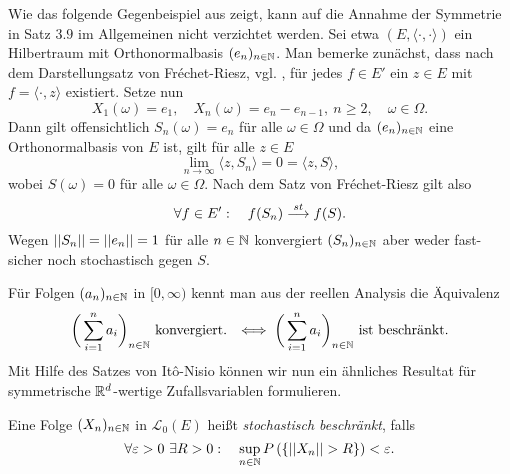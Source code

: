 \begin{remark}
    Wie das folgende Gegenbeispiel aus \cite{ito-nisio} zeigt, kann auf die Annahme der Symmetrie in Satz $3.9$ im Allgemeinen nicht verzichtet werden. Sei etwa $(E, \langle\cdot,\cdot\rangle)$ ein Hilbertraum mit Orthonormalbasis $(e_n)_{n \in \mathbb{N}}$.
    Man bemerke zunächst, dass nach dem Darstellungsatz von Fréchet-Riesz, vgl. \cite[Theorem V.3.6]{werner}, für jedes $f \in E'$ ein $z \in E$ mit $f = \langle \cdot, z \rangle$ existiert. 
    Setze nun 
    $$
        X_1(\omega) = e_1, \quad X_n(\omega) = e_n - e_{n-1}, \ n \geq 2, \quad \omega \in \Omega. 
    $$
    Dann gilt offensichtlich $S_n(\omega) = e_n$ für alle $\omega \in \Omega$ und da $(e_n)_{n \in \mathbb{N}}$ eine Orthonormalbasis von $E$ ist, gilt für alle $z \in E$
    $$
        \lim_{n \to \infty}\langle z,S_n \rangle = 0 = \langle z,S \rangle,
    $$
    wobei $S(\omega) = 0$ für alle $\omega \in \Omega$. Nach dem Satz von Fréchet-Riesz gilt also 
    $$
        \forall f \in E': \quad f(S_n) \overset{st}{\longrightarrow} f(S). 
    $$
    Wegen $\lvert\lvert S_n \rvert\rvert = \lvert\lvert e_n \rvert\rvert =1$ für alle $n \in \mathbb{N}$ konvergiert $(S_n)_{n \in \mathbb{N}}$ aber weder fast-sicher noch stochastisch gegen $S$. 
    \qexampled 
\end{remark}

Für Folgen $(a_n)_{n \in \mathbb{N}}$ in $[0, \infty)$ kennt man aus der reellen Analysis die Äquivalenz
$$
    \bigg(\sum_{i=1}^n a_i\bigg)_{n \in \mathbb{N}} \text{ konvergiert. } \iff \bigg(\sum_{i=1}^n a_i\bigg)_{n \in \mathbb{N}} \text{ ist beschränkt.}
$$
Mit Hilfe des Satzes von Itô-Nisio können wir nun ein ähnliches Resultat für symmetrische $\mathbb{R}^d$-wertige Zufallsvariablen formulieren. 

\begin{mydef}
    Eine Folge $(X_n)_{n \in \mathbb{N}}$ in $\mathcal{L}_0(E)$ heißt \textit{stochastisch beschränkt}, falls
    $$
        \forall \varepsilon >0 \ \exists R > 0: \quad \sup_{n \in \mathbb{N}}P\left(\left\{ \lvert\lvert X_n \rvert\rvert > R \right\}\right) < \varepsilon. 
    $$
\end{mydef}

